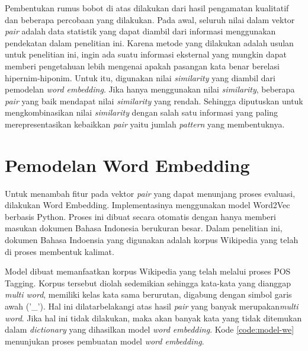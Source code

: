 Pembentukan rumus bobot di atas dilakukan dari hasil pengamatan kualitatif dan beberapa percobaan yang dilakukan. Pada awal, seluruh nilai dalam vektor \textit{pair} adalah data statistik yang dapat diambil dari informasi menggunakan pendekatan dalam penelitian ini. Karena metode yang dilakukan adalah usulan untuk penelitian ini, ingin ada suatu informasi eksternal yang mungkin dapat memberi pengetahuan lebih mengenai apakah pasangan kata benar berelasi hipernim-hiponim. Untuk itu, digunakan nilai \textit{similarity} yang diambil dari pemodelan \textit{word embedding}. Jika hanya menggunakan nilai \textit{similarity}, beberapa \textit{pair} yang baik mendapat nilai \textit{similarity} yang rendah. Sehingga diputuskan untuk mengkombinasikan nilai \textit{similarity} dengan salah satu informasi yang paling merepresentasikan kebaikkan \textit{pair} yaitu jumlah \textit{pattern} yang membentuknya. 
%

%
\section{Pemodelan Word Embedding}
Untuk menambah fitur pada vektor \textit{pair} yang dapat menunjang proses evaluasi, dilakukan Word Embedding. Implementasinya menggunakan model Word2Vec berbasis Python. Proses ini dibuat secara otomatis dengan hanya memberi masukan dokumen Bahasa Indonesia berukuran besar. Dalam penelitian ini, dokumen Bahasa Indoensia yang digunakan adalah korpus Wikipedia yang telah di proses membentuk kalimat.

Model dibuat memanfaatkan korpus Wikipedia yang telah melalui proses POS Tagging. Korpus tersebut diolah sedemikian sehingga kata-kata yang dianggap \textit{multi word}, memiliki kelas kata sama berurutan, digabung dengan simbol garis  awah ('\_'). Hal ini dilatarbelakangi atas hasil \textit{pair} yang banyak merupakan\textit{multi word}. Jika hal ini tidak dilakukan, maka akan banyak kata yang tidak ditemukan dalam \textit{dictionary} yang dihasilkan model \textit{word embedding}. Kode \ref{code:model-we} menunjukan proses pembuatan model \textit{word embedding}.

